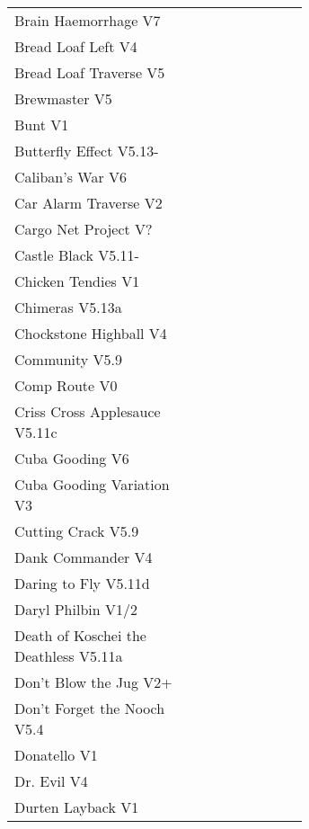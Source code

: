 \begin{flushleft}
\begin{center}
\begin{supertabular}{p{0.65\linewidth}r}
Brain Haemorrhage V7 & \pageref{vr:Brain Haemorrhage} \\
Bread Loaf Left V4 & \pageref{rt:Bread Loaf Left} \\
Bread Loaf Traverse V5 & \pageref{rt:Bread Loaf Traverse} \\
Brewmaster V5 & \pageref{rt:Brewmaster} \\
Bunt V1 & \pageref{rt:Bunt} \\
Butterfly Effect V5.13- & \pageref{rt:Butterfly Effect} \\
Caliban's War V6 & \pageref{rt:Caliban's War} \\
Car Alarm Traverse V2 & \pageref{rt:Car Alarm Traverse} \\
Cargo Net Project V? & \pageref{rt:Cargo Net Project} \\
Castle Black V5.11- & \pageref{rt:Castle Black} \\
Chicken Tendies V1 & \pageref{rt:Chicken Tendies} \\
Chimeras V5.13a & \pageref{rt:Chimeras} \\
Chockstone Highball V4 & \pageref{rt:Chockstone Highball} \\
Community V5.9 & \pageref{rt:Community} \\
Comp Route V0 & \pageref{rt:Comp Route} \\
Criss Cross Applesauce V5.11c & \pageref{rt:Criss Cross Applesauce} \\
Cuba Gooding V6 & \pageref{rt:Cuba Gooding} \\
Cuba Gooding Variation V3 & \pageref{vr:Cuba Gooding Variation} \\
Cutting Crack V5.9 & \pageref{rt:Cutting Crack} \\
Dank Commander V4 & \pageref{rt:Dank Commander} \\
Daring to Fly V5.11d & \pageref{rt:Daring to Fly} \\
Daryl Philbin V1/2 & \pageref{rt:Daryl Philbin} \\
Death of Koschei the Deathless V5.11a & \pageref{rt:Death of Koschei the Deathless} \\
Don't Blow the Jug V2+ & \pageref{rt:Don't Blow the Jug} \\
Don't Forget the Nooch V5.4 & \pageref{rt:Don't Forget the Nooch} \\
Donatello V1 & \pageref{rt:Donatello} \\
Dr. Evil V4 & \pageref{rt:Dr. Evil} \\
Durten Layback V1 & \pageref{rt:Durten Layback} \\

\end{supertabular}
\end{center}
\end{flushleft}
